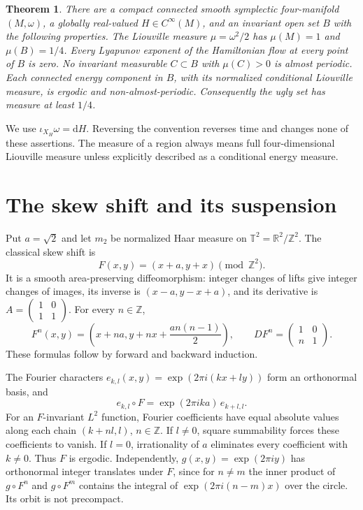 \documentclass[11pt]{article}
\newtheorem{theorem}{Theorem}
\newcommand{\T}{\mathbb T}
\newcommand{\R}{\mathbb R}
\newcommand{\Z}{\mathbb Z}
\newcommand{\dd}{\mathrm d}
\begin{document}
\begin{theorem}\label{thm:main}
There are a compact connected smooth symplectic four-manifold $(M,\omega)$,
a globally real-valued $H\in C^\infty(M)$, and an invariant open set $B$
with the following properties. The Liouville measure
$\mu=\omega^2/2$ has $\mu(M)=1$ and $\mu(B)=1/4$.
Every Lyapunov exponent of the Hamiltonian flow at every point of $B$ is zero.
No invariant measurable $C\subset B$ with $\mu(C)>0$ is almost periodic.
Each connected energy component in $B$, with its normalized conditional
Liouville measure, is ergodic and non-almost-periodic.
Consequently the ugly set has measure at least $1/4$.
\end{theorem}

We use $\iota_{X_H}\omega=\dd H$. Reversing the convention reverses
time and changes none of these assertions. The measure of a region always
means full four-dimensional Liouville measure unless explicitly described
as a conditional energy measure.

\section{The skew shift and its suspension}

Put $a=\sqrt2$ and let $m_2$ be normalized Haar measure on
$\T^2=\R^2/\Z^2$. The classical skew shift is
\[
 F(x,y)=(x+a,y+x)\pmod{\Z^2}.
\]
It is a smooth area-preserving diffeomorphism: integer changes of lifts
give integer changes of images, its inverse is
$(x-a,y-x+a)$, and its derivative is
$A=\left(\begin{smallmatrix}1&0\\1&1\end{smallmatrix}\right)$.
For every $n\in\Z$,
\begin{equation}\label{eq:iterate}
 F^n(x,y)=\left(x+na,y+nx+\frac{a n(n-1)}2\right),\qquad
 D F^n=\begin{pmatrix}1&0\\n&1\end{pmatrix}.
\end{equation}
These formulas follow by forward and backward induction.

The Fourier characters $e_{k,l}(x,y)=\exp(2\pi i(kx+ly))$
form an orthonormal basis, and
\[
 e_{k,l}\circ F=\exp(2\pi i k a)\,e_{k+l,l}.
\]
For an $F$-invariant $L^2$ function, Fourier coefficients have equal
absolute values along each chain $(k+nl,l)$, $n\in\Z$.
If $l\ne0$, square summability forces these coefficients to vanish.
If $l=0$, irrationality of $a$ eliminates every coefficient with $k\ne0$.
Thus $F$ is ergodic. Independently, $g(x,y)=\exp(2\pi i y)$ has
orthonormal integer translates under $F$, since for $n\ne m$ the
inner product of $g\circ F^n$ and $g\circ F^m$ contains the integral
of $\exp(2\pi i(n-m)x)$ over the circle. Its orbit is not precompact.
\end{document}
